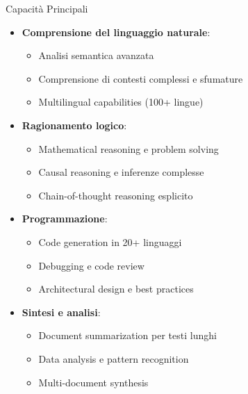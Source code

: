 \documentclass[aspectratio=169]{beamer}
\begin{document}
%
%
\begin{frame}{Capacità Principali}
\begin{itemize}
    \item \textbf{Comprensione del linguaggio naturale}:
    \begin{itemize}
        \item Analisi semantica avanzata
        \item Comprensione di contesti complessi e sfumature
        \item Multilingual capabilities (100+ lingue)
    \end{itemize}
    
    \item \textbf{Ragionamento logico}:
    \begin{itemize}
        \item Mathematical reasoning e problem solving
        \item Causal reasoning e inferenze complesse
        \item Chain-of-thought reasoning esplicito
    \end{itemize}
    
    \item \textbf{Programmazione}:
    \begin{itemize}
        \item Code generation in 20+ linguaggi
        \item Debugging e code review
        \item Architectural design e best practices
    \end{itemize}
    
    \item \textbf{Sintesi e analisi}:
    \begin{itemize}
        \item Document summarization per testi lunghi
        \item Data analysis e pattern recognition
        \item Multi-document synthesis
    \end{itemize}
\end{itemize}
\end{frame}
%
%
\end{document}
